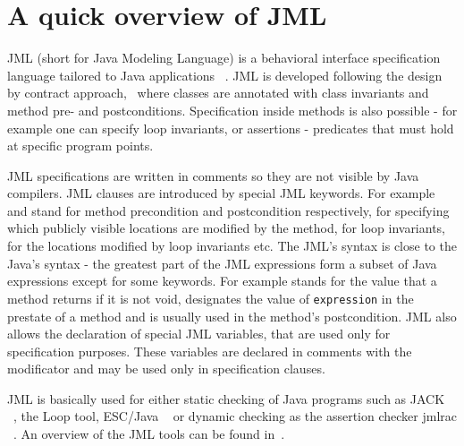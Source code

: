 \section{A quick overview of JML}\label{prelim}
JML (short for Java Modeling Language) is a behavioral interface specification language tailored to Java applications ~\cite{JMLRefMan}. JML is developed 
following the design by contract approach,~\cite{M97oos} where classes are annotated with class invariants and method pre- and postconditions. Specification
inside methods is also possible - for example one can specify loop invariants, or assertions - predicates that must hold at specific program points. 

JML specifications are written in comments so they are not visible by Java compilers. JML clauses are introduced by 
special JML keywords. For example  and  stand for method precondition and postcondition respectively,  for specifying which publicly visible locations are modified by the method,  for loop invariants,  for the locations modified by loop invariants  etc. The JML's syntax is close to the Java's syntax - the greatest part of the JML expressions form a subset of Java expressions except for some keywords. For example  stands for the value that a method returns if it is not void,  designates the value of \texttt{expression} in the prestate of a method and is usually used in the method's postcondition. JML also allows the declaration of special JML variables, that are used only for specification purposes. 
These variables are declared in comments with the  modificator and may be used only in specification clauses. 

JML is basically used for either static checking of Java programs such as JACK ~\cite{BR02jack}, the Loop tool, ESC/Java ~\cite{escjava} or dynamic checking as the assertion checker jmlrac ~\cite{jmlrac}. An overview of the JML tools can be found in~\cite{BurdyCCEKLLP03}.
     
